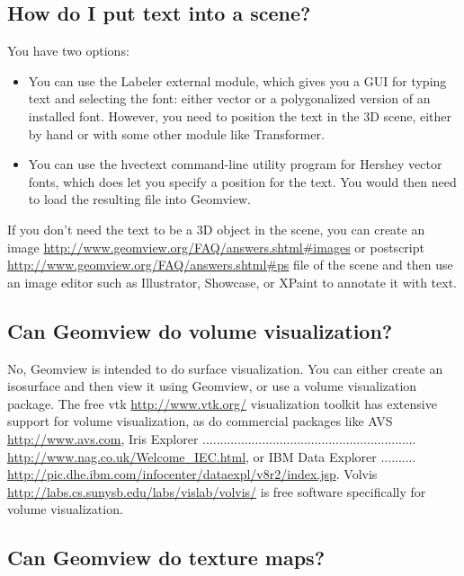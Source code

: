 \documentclass[12pt,a4paper]{article}
\begin{document}
    \subsection{How do I put text into a scene?}

        You have two options:
          \begin{itemize}
          \item You can use the Labeler external module, which gives you a GUI for
            typing text and selecting the font: either vector or a polygonalized
            version of an installed font. However, you need to position the text
            in the 3D scene, either by hand or with some other module like
            Transformer.
          \item You can use the hvectext command-line utility program for Hershey
            vector fonts, which does let you specify a position for the text.
            You would then need to load the resulting file into Geomview.
          \end{itemize}
        If you don't need the text to be a 3D object in the scene, you can
        create an image \url{http://www.geomview.org/FAQ/answers.shtml#images} or postscript \url{http://www.geomview.org/FAQ/answers.shtml#ps}
        file of the scene and then use an image editor such as Illustrator,
        Showcase, or XPaint to annotate it with text.

    \subsection{Can Geomview do volume visualization?}

        No, Geomview is intended to do surface visualization. You can either
        create an isosurface and then view it using Geomview, or use a volume
        visualization package. The free vtk \url{http://www.vtk.org/}
        visualization toolkit has extensive support for volume visualization, as
        do commercial packages like AVS \url{http://www.avs.com}, Iris Explorer
        .............................................................\\
         \url{http://www.nag.co.uk/Welcome\_IEC.html}, or IBM Data Explorer
        ..........\\ \url{http://pic.dhe.ibm.com/infocenter/dataexpl/v8r2/index.jsp}. Volvis
        \url{http://labs.cs.sunysb.edu/labs/vislab/volvis/} is free software specifically for
        volume visualization.

    \subsection{Can Geomview do texture maps?}
\end{document}
